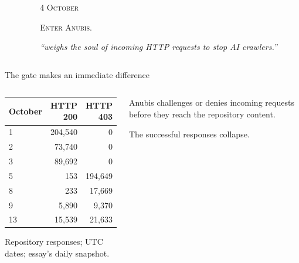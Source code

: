 \documentclass[aspectratio=169,11pt]{beamer}
\begin{document}
{\AtlasGrandNight
\begin{frame}[plain]
  \begin{columns}[c,onlytextwidth]
    \begin{column}{.43\textwidth}\centering{}\end{column}
    \begin{column}{.51\textwidth}
      {\color{AtlasGoldLight}\small\scshape 4 October\par}\bigskip
      {\color{AtlasIvory}\fontsize{32}{36}\selectfont\scshape Enter Anubis.\par}
      \bigskip
      {\color{AtlasIvory}\large\itshape ``weighs the soul of incoming HTTP
        requests to stop AI crawlers.''\par}
    \end{column}
  \end{columns}
\end{frame}}

\begin{frame}{The gate makes an immediate difference}
  \begin{columns}[c,onlytextwidth]
    \begin{column}{.55\textwidth}
      \small
      \begin{tabular}{@{}lrr@{}}\toprule
        October & HTTP 200 & HTTP 403\\\midrule
        1 & 204,540 & 0\\
        2 & 73,740 & 0\\
        3 & 89,692 & 0\\\midrule
        5 & 153 & 194,649\\
        8 & 233 & 17,669\\
        9 & 5,890 & 9,370\\
        13 & 15,539 & 21,633\\\bottomrule
      \end{tabular}\par\smallskip
      {\scriptsize Repository responses; UTC dates; essay's daily snapshot.}
    \end{column}
    \begin{column}{.39\textwidth}
      Anubis challenges or denies incoming requests before they reach
      the repository content.\par\medskip
      The successful responses collapse.\par\medskip
    \end{column}
  \end{columns}
\end{frame}
\end{document}
